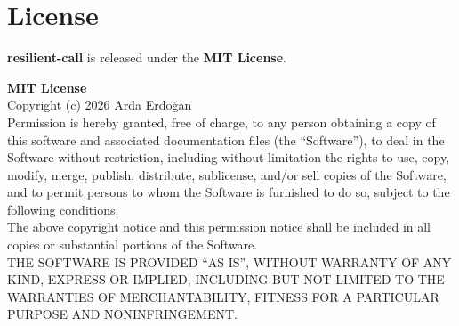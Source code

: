 \section{License}
\label{sec:license}

\textbf{resilient-call} is released under the \textbf{MIT License}.

\begin{mdframed}
\small
\textbf{MIT License}\\[6pt]
Copyright (c) 2026 Arda Erdoğan\\[6pt]
Permission is hereby granted, free of charge, to any person obtaining a copy
of this software and associated documentation files (the ``Software''), to deal
in the Software without restriction, including without limitation the rights
to use, copy, modify, merge, publish, distribute, sublicense, and/or sell
copies of the Software, and to permit persons to whom the Software is
furnished to do so, subject to the following conditions:\\[6pt]
The above copyright notice and this permission notice shall be included in all
copies or substantial portions of the Software.\\[6pt]
THE SOFTWARE IS PROVIDED ``AS IS'', WITHOUT WARRANTY OF ANY KIND, EXPRESS OR
IMPLIED, INCLUDING BUT NOT LIMITED TO THE WARRANTIES OF MERCHANTABILITY,
FITNESS FOR A PARTICULAR PURPOSE AND NONINFRINGEMENT\@.
\end{mdframed}
